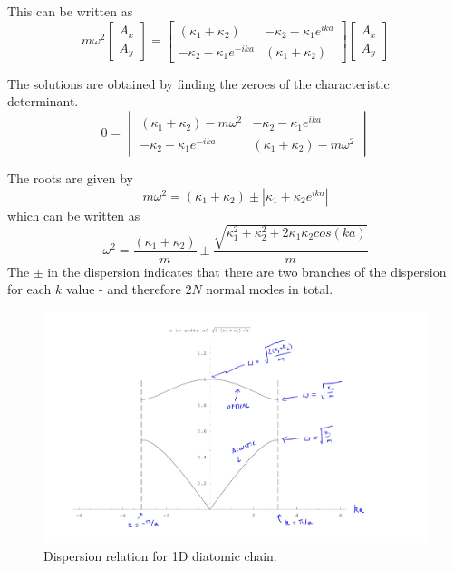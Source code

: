 \documentclass[10pt]{article}
\begin{document}
This can be written as
$$
m\omega^{2} \begin{bmatrix}
A_{x}\\ A_{y}
\end{bmatrix} =
\begin{bmatrix}
 (\kappa_{1} + \kappa_{2})& -\kappa_{2} - \kappa_{1}e^{ika}\\
-\kappa_{2}-\kappa_{1}e^{-ika} & (\kappa_{1} + \kappa_{2})
\end{bmatrix}
\begin{bmatrix}
A_{x}\\ A_{y}
\end{bmatrix}
$$

The solutions are obtained by finding the zeroes of the characteristic determinant.
$$
0 = \begin{vmatrix}
 (\kappa_{1} + \kappa_{2}) - m\omega^{2}& -\kappa_{2} - \kappa_{1}e^{ika}\\
-\kappa_{2}-\kappa_{1}e^{-ika} & (\kappa_{1} + \kappa_{2})-m\omega^{2}
\end{vmatrix}
$$

The roots are given by
$$
m\omega^{2} = (\kappa_{1} + \kappa_{2}) \pm \left | \kappa_{1} + \kappa_{2}e^{ika}\right |
$$
which can be written as
$$
\omega^{2} = \frac{(\kappa_{1} + \kappa_{2})}{m} \pm \frac{\sqrt{\kappa_{1}^{2} + \kappa_{2}^{2} + 2\kappa_{1}\kappa_{2}cos(ka)}}{m}
$$
The $\pm$ in the dispersion indicates that there are two branches of the dispersion for each $k$ value - and therefore $2N$ normal modes
in total.

\begin{figure}
  \includegraphics[width=\linewidth]{1d_dia_disp.png}
  \caption{Dispersion relation for 1D diatomic chain.}
\end{figure}
\end{document}
